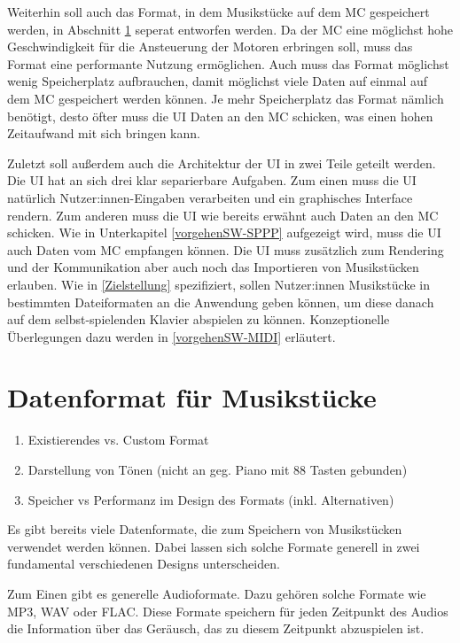 Weiterhin soll auch das Format, in dem Musikstücke auf dem \ac{MC} gespeichert werden, in Abschnitt \ref{vorgehenSW-PIDI} seperat entworfen werden.
Da der \ac{MC} eine möglichst hohe Geschwindigkeit für die Ansteuerung der Motoren erbringen soll, muss das Format eine performante Nutzung ermöglichen.
Auch muss das Format möglichst wenig Speicherplatz aufbrauchen, damit möglichst viele Daten auf einmal auf dem \ac{MC} gespeichert werden können.
Je mehr Speicherplatz das Format nämlich benötigt, desto öfter muss die \ac{UI} Daten an den \ac{MC} schicken, was einen hohen Zeitaufwand mit sich bringen kann.

Zuletzt soll außerdem auch die Architektur der \ac{UI} in zwei Teile geteilt werden.
Die \ac{UI} hat an sich drei klar separierbare Aufgaben.
Zum einen muss die \ac{UI} natürlich Nutzer:innen-Eingaben verarbeiten und ein graphisches Interface rendern.
Zum anderen muss die \ac{UI} wie bereits erwähnt auch Daten an den \ac{MC} schicken.
Wie in Unterkapitel \ref{vorgehenSW-SPPP} aufgezeigt wird, muss die \ac{UI} auch Daten vom \ac{MC} empfangen können.
Die UI muss zusätzlich zum Rendering und der Kommunikation aber auch noch das Importieren von Musikstücken erlauben.
Wie in \ref{Zielstellung} spezifiziert, sollen Nutzer:innen Musikstücke in bestimmten Dateiformaten an die Anwendung geben können, um diese danach auf dem selbst-spielenden Klavier abspielen zu können.
Konzeptionelle Überlegungen dazu werden in \ref{vorgehenSW-MIDI} erläutert.


\section{Datenformat für Musikstücke} \label{vorgehenSW-PIDI}
\begin{enumerate}
	\item Existierendes vs. Custom Format
	\item Darstellung von Tönen (nicht an geg. Piano mit 88 Tasten gebunden)
	\item Speicher vs Performanz im Design des Formats (inkl. Alternativen)
\end{enumerate}

Es gibt bereits viele Datenformate, die zum Speichern von Musikstücken verwendet werden können. Dabei lassen sich solche Formate generell in zwei fundamental verschiedenen Designs unterscheiden.

Zum Einen gibt es generelle Audioformate. Dazu gehören solche Formate wie MP3, WAV oder FLAC.
Diese Formate speichern für jeden Zeitpunkt des Audios die Information über das Geräusch, das zu diesem Zeitpunkt abzuspielen ist.

